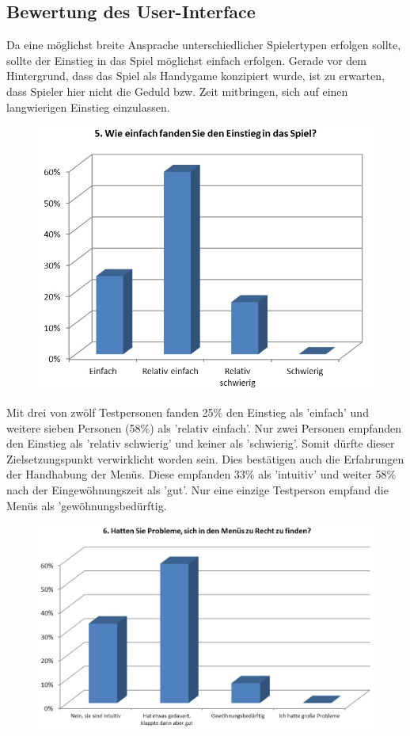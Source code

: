 \documentclass[extern,palatino]{cgBA}
\begin{document}
\subsection{Bewertung des User-Interface}
Da eine möglichst breite Ansprache unterschiedlicher Spielertypen erfolgen sollte, sollte der Einstieg in das Spiel möglichst einfach erfolgen. Gerade vor dem Hintergrund, dass das Spiel als Handygame konzipiert wurde, ist zu erwarten, dass Spieler hier nicht die Geduld bzw. Zeit mitbringen, sich auf einen langwierigen Einstieg einzulassen. 
\begin{figure}[H]
	\centering
	\includegraphics[width=1\textwidth]{table4.jpg}
\end{figure}
Mit drei von zwölf Testpersonen fanden 25\% den Einstieg als 'einfach' und weitere sieben Personen (58\%) als 'relativ einfach'. Nur zwei Personen empfanden den Einstieg als 'relativ schwierig' und keiner als 'schwierig'. Somit dürfte dieser Zielsetzungspunkt verwirklicht worden sein. 
Dies bestätigen auch die Erfahrungen der Handhabung der Menüs. Diese empfanden 33\% als 'intuitiv' und weiter 58\% nach der Eingewöhnungszeit als 'gut'. Nur eine einzige Testperson empfand die Menüs als 'gewöhnungsbedürftig. 
\begin{figure}[H]
	\centering
	\includegraphics[width=1\textwidth]{table5.jpg}
\end{figure}
\end{document}
